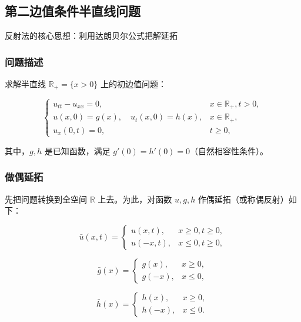 \documentclass[12pt,a4paper]{article}
\numberwithin{subsection}{section}   %
\numberwithin{subsubsection}{subsection}
\theoremstyle{plain}
\theoremstyle{definition}
\theoremstyle{remark}
\theoremstyle{remark}
\begin{document}
	
	
		\subsection{第二边值条件半直线问题}
		反射法的核心思想：利用达朗贝尔公式把解延拓
		
		\subsubsection{问题描述}
		求解半直线 \(\mathbb{R}_+ = \{x > 0\}\) 上的初边值问题：
		
		\begin{equation}
			\begin{cases}
				u_{tt} - u_{xx} = 0, & x \in \mathbb{R}_+, t > 0, \\
				u(x, 0) = g(x), \quad u_t(x, 0) = h(x), & x \in \mathbb{R}_+, \\
				u_x(0, t) = 0, & t \geq 0,
			\end{cases}
		\end{equation}
		
		其中，\(g, h\) 是已知函数，满足 \(g'(0) = h'(0) = 0\)（自然相容性条件）。
		
		\subsubsection{做偶延拓}
		先把问题转换到全空间 \(\mathbb{R}\) 上去。为此，对函数 \(u, g, h\) 作偶延拓（或称偶反射）如下：
		
		\begin{equation}
			\bar{u}(x, t) = \begin{cases}
				u(x, t), & x \geq 0, t \geq 0, \\
				u(-x, t), & x \leq 0, t \geq 0,
			\end{cases}
		\end{equation}
		
		\begin{equation}
			\bar{g}(x) = \begin{cases}
				g(x), & x \geq 0, \\
				g(-x), & x \leq 0,
			\end{cases}
		\end{equation}
		
		\begin{equation}
			\bar{h}(x) = \begin{cases}
				h(x), & x \geq 0, \\
				h(-x), & x \leq 0.
			\end{cases}
		\end{equation}
		
\end{document}
